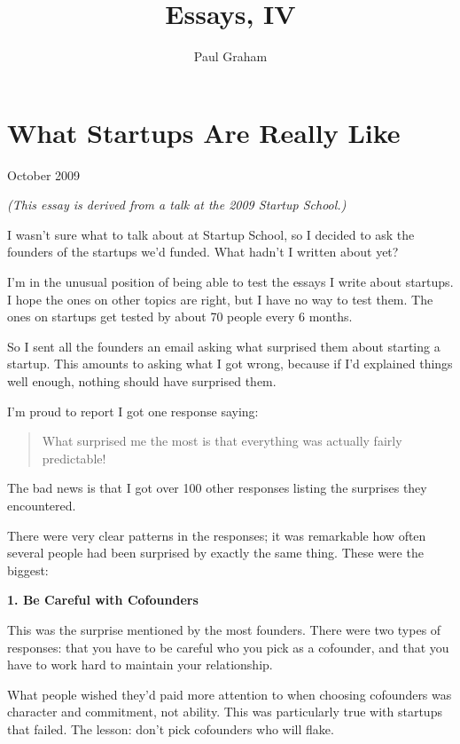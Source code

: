 \documentclass[12pt]{book}
\title{Essays, IV}
\author{Paul Graham}
\date{}
\begin{document}
\frontmatter
\maketitle
\tableofcontents
\clearpage
\mainmatter

\chapter{What Startups Are Really Like}

October 2009

\emph{(This essay is derived from a talk at the 2009 Startup School.)}

I wasn't sure what to talk about at Startup School, so I decided to ask
the founders of the startups we'd funded. What hadn't I written about
yet?

I'm in the unusual position of being able to test the essays I write
about startups. I hope the ones on other topics are right, but I have no
way to test them. The ones on startups get tested by about 70 people
every 6 months.

So I sent all the founders an email asking what surprised them about
starting a startup. This amounts to asking what I got wrong, because if
I'd explained things well enough, nothing should have surprised them.

I'm proud to report I got one response saying:

\begin{quote}
What surprised me the most is that everything was actually fairly
predictable!
\end{quote}

The bad news is that I got over 100 other responses listing the
surprises they encountered.

There were very clear patterns in the responses; it was remarkable how
often several people had been surprised by exactly the same thing. These
were the biggest:

\textbf{1. Be Careful with Cofounders}

This was the surprise mentioned by the most founders. There were two
types of responses: that you have to be careful who you pick as a
cofounder, and that you have to work hard to maintain your relationship.

What people wished they'd paid more attention to when choosing
cofounders was character and commitment, not ability. This was
particularly true with startups that failed. The lesson: don't pick
cofounders who will flake.
\end{document}
